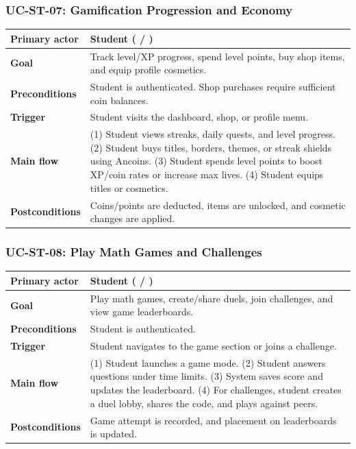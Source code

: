 \subsubsection{UC-ST-07: Gamification Progression and Economy}
\begin{longtable}{L{0.28\textwidth}L{0.62\textwidth}}
\textbf{Primary actor} & Student ( / ) \\ \hline
\textbf{Goal} & Track level/XP progress, spend level points, buy shop items, and equip profile cosmetics. \\ \hline
\textbf{Preconditions} & Student is authenticated. Shop purchases require sufficient coin balances. \\ \hline
\textbf{Trigger} & Student visits the dashboard, shop, or profile menu. \\ \hline
\textbf{Main flow} & (1) Student views streaks, daily quests, and level progress. (2) Student buys titles, borders, themes, or streak shields using Ancoins. (3) Student spends level points to boost XP/coin rates or increase max lives. (4) Student equips titles or cosmetics. \\ \hline
\textbf{Postconditions} & Coins/points are deducted, items are unlocked, and cosmetic changes are applied. \\
\end{longtable}

\subsubsection{UC-ST-08: Play Math Games and Challenges}
\begin{longtable}{L{0.28\textwidth}L{0.62\textwidth}}
\textbf{Primary actor} & Student ( / ) \\ \hline
\textbf{Goal} & Play math games, create/share duels, join challenges, and view game leaderboards. \\ \hline
\textbf{Preconditions} & Student is authenticated. \\ \hline
\textbf{Trigger} & Student navigates to the game section or joins a challenge. \\ \hline
\textbf{Main flow} & (1) Student launches a game mode. (2) Student answers questions under time limits. (3) System saves score and updates the leaderboard. (4) For challenges, student creates a duel lobby, shares the code, and plays against peers. \\ \hline
\textbf{Postconditions} & Game attempt is recorded, and placement on leaderboards is updated. \\
\end{longtable}

